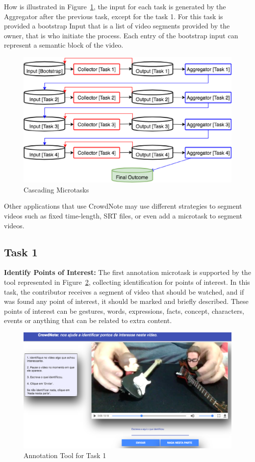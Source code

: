 How is illustrated in Figure~\ref{cascading}, the input for each task is generated by the Aggregator after the previous task, except for the task 1. For this task is provided a bootstrap Input that is a list of video segments provided by the owner, that is who initiate the process. Each entry of the bootstrap input can represent a semantic block of the video. 

\begin{figure}[h!]
 \centerline{\includegraphics[scale=0.35] {figure/Cascading}}
	\caption{Cascading Microtasks}
	\label{cascading}
\end{figure}

Other applications that use CrowdNote may use different strategies to segment videos such as fixed time-length, SRT files, or even add a microtask to segment videos.
		


\subsection{Task 1}
\textbf{Identify Points of Interest:} The first annotation microtask is supported by the tool represented in Figure~\ref{task_1}, collecting identification for points of interest. In this task, the contributor receives a segment of video that should be watched, and if was found any point of interest, it should be marked and briefly described. These points of interest can be gestures, words, expressions, facts, concept, characters, events or anything that can be related to extra content.

\begin{figure}[h!]
	\centerline{\includegraphics[scale=0.22] {figure/task_1}}
	\caption{Annotation Tool for Task 1}
	\label{task_1}
\end{figure}

